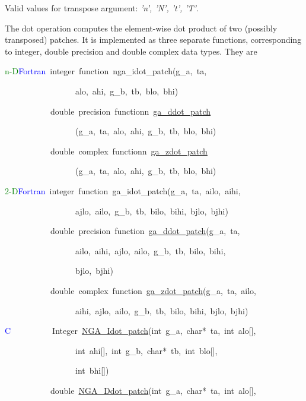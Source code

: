 Valid values for transpose argument:\emph{ 'n', 'N', 't', 'T'}.

The dot operation computes the element-wise dot product of two (possibly
transposed) patches. It is implemented as three separate functions,
corresponding to integer, double precision and double complex data
types. They are
\begin{lyxcode}
\textcolor{green}{n-D}\textcolor{blue}{Fortran}~integer~function~nga\_idot\_patch(g\_a,~ta,~

~~~~~~~~~~~~~~~~~alo,~ahi,~g\_b,~tb,~blo,~bhi)~

~~~~~~~~~~~double~precision~functionn~\href{http://www.emsl.pnl.gov/docs/global/ga_ops.html\#ga_ddot_patch}{ga\_{}ddot\_{}patch}

~~~~~~~~~~~~~~~~~(g\_a,~ta,~alo,~ahi,~g\_b,~tb,~blo,~bhi)~

~~~~~~~~~~~double~complex~functionn~\href{http://www.emsl.pnl.gov/docs/global/ga_ops.html\#ga_zdot_patch}{ga\_{}zdot\_{}patch}

~~~~~~~~~~~~~~~~~(g\_a,~ta,~alo,~ahi,~g\_b,~tb,~blo,~bhi)



\textcolor{green}{2-D}\textcolor{blue}{Fortran}~integer~function~ga\_idot\_patch(g\_a,~ta,~ailo,~aihi,

~~~~~~~~~~~~~~~~~ajlo,~ailo,~g\_b,~tb,~bilo,~bihi,~bjlo,~bjhi)~

~~~~~~~~~~~double~precision~function~\href{http://www.emsl.pnl.gov/docs/global/ga_ops.html\#ga_ddot_patch}{ga\_{}ddot\_{}patch}(g\_a,~ta,~

~~~~~~~~~~~~~~~~~ailo,~aihi,~ajlo,~ailo,~g\_b,~tb,~bilo,~bihi,~

~~~~~~~~~~~~~~~~~bjlo,~bjhi)~

~~~~~~~~~~~double~complex~function~\href{http://www.emsl.pnl.gov/docs/global/ga_ops.html\#ga_zdot_patch}{ga\_{}zdot\_{}patch}(g\_a,~ta,~ailo,~

~~~~~~~~~~~~~~~~~aihi,~ajlo,~ailo,~g\_b,~tb,~bilo,~bihi,~bjlo,~bjhi)



\textcolor{blue}{C}~~~~~~~~~~Integer~\href{http://www.emsl.pnl.gov/docs/global/c_nga_ops.html\#ga_dot_patch}{NGA\_{}Idot\_{}patch}(int~g\_a,~char{*}~ta,~int~alo{[}{]},~

~~~~~~~~~~~~~~~~~int~ahi{[}{]},~int~g\_b,~char{*}~tb,~int~blo{[}{]},~

~~~~~~~~~~~~~~~~~int~bhi{[}{]})~

~~~~~~~~~~~double~\href{http://www.emsl.pnl.gov/docs/global/c_nga_ops.html\#ga_dot_patch}{NGA\_{}Ddot\_{}patch}(int~g\_a,~char{*}~ta,~int~alo{[}{]},~


\end{lyxcode}
